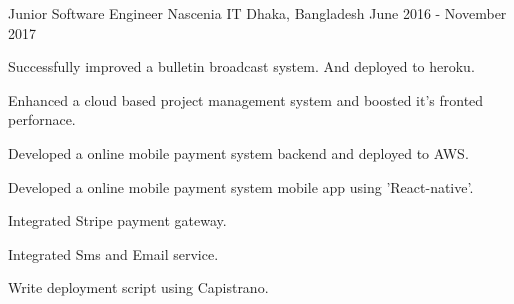 \begin{cventries}
\cventry
    {Junior Software Engineer}
    {Nascenia IT}
    {Dhaka, Bangladesh}
    {June 2016 - November 2017}
    {
      \begin{cvitemsNumber}[Responsibilities:]
        \vspace{1mm}
        \item {Successfully improved a bulletin broadcast system. And deployed to heroku.}
        \vspace{1mm}
        \item {Enhanced a cloud based project management system and boosted it's fronted perfornace.}
        \vspace{1mm}
        \item {Developed a online mobile payment system backend and deployed to AWS.}
        \vspace{1mm}
        \item {Developed a online mobile payment system mobile app using 'React-native'.}
        \vspace{1mm}
        \item {Integrated Stripe payment gateway.}
        \vspace{1mm}
        \item {Integrated Sms and Email service.}
        \vspace{1mm}
        \item {Write deployment script using Capistrano.}
        \vspace{1mm}
      \end{cvitemsNumber}
    }
\end{cventries}
